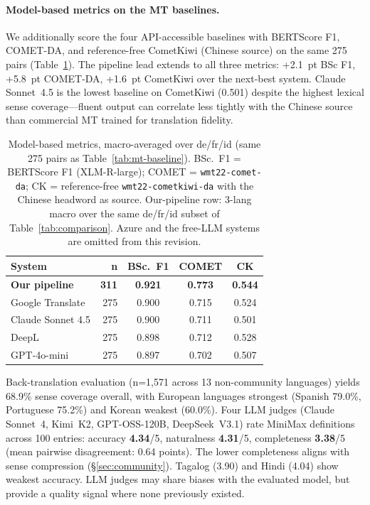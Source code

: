 \documentclass[11pt]{article}
\begin{document}
\paragraph{Model-based metrics on the MT baselines.} We additionally score the four API-accessible baselines with BERTScore F1, COMET-DA, and reference-free CometKiwi (Chinese source) on the same 275 pairs (Table~\ref{tab:mt-baseline-semantic}). The pipeline lead extends to all three metrics: +2.1~pt BSc F1, +5.8~pt COMET-DA, +1.6~pt CometKiwi over the next-best system. Claude Sonnet~4.5 is the lowest baseline on CometKiwi (0.501) despite the highest lexical sense coverage---fluent output can correlate less tightly with the Chinese source than commercial MT trained for translation fidelity.

\begin{table}[t]
\centering
\small
\begin{tabular}{lrccc}
\toprule
\textbf{System} & \textbf{n} & \textbf{BSc.\ F1} & \textbf{COMET} & \textbf{CK} \\
\midrule
\textbf{Our pipeline} & \textbf{311} & \textbf{0.921} & \textbf{0.773} & \textbf{0.544} \\
\addlinespace
Google Translate  & 275 & 0.900 & 0.715 & 0.524 \\
Claude Sonnet 4.5 & 275 & 0.900 & 0.711 & 0.501 \\
DeepL             & 275 & 0.898 & 0.712 & 0.528 \\
GPT-4o-mini       & 275 & 0.897 & 0.702 & 0.507 \\
\bottomrule
\end{tabular}
\caption{Model-based metrics, macro-averaged over de/fr/id (same 275 pairs as Table~\ref{tab:mt-baseline}). BSc.\ F1 = BERTScore F1 (XLM-R-large); COMET = \texttt{wmt22-comet-da}; CK = reference-free \texttt{wmt22-cometkiwi-da} with the Chinese headword as source. Our-pipeline row: 3-lang macro over the same de/fr/id subset of Table~\ref{tab:comparison}. Azure and the free-LLM systems are omitted from this revision.}
\label{tab:mt-baseline-semantic}
\end{table}

Back-translation evaluation (n=1{,}571 across 13 non-community languages) yields 68.9\% sense coverage overall, with European languages strongest (Spanish 79.0\%, Portuguese 75.2\%) and Korean weakest (60.0\%). Four LLM judges (Claude Sonnet~4, Kimi~K2, GPT-OSS-120B, DeepSeek~V3.1) rate MiniMax definitions across 100 entries: accuracy \textbf{4.34}/5, naturalness \textbf{4.31}/5, completeness \textbf{3.38}/5 (mean pairwise disagreement: 0.64 points). The lower completeness aligns with sense compression (\S\ref{sec:community}). Tagalog (3.90) and Hindi (4.04) show weakest accuracy. LLM judges may share biases with the evaluated model, but provide a quality signal where none previously existed.
\end{document}
